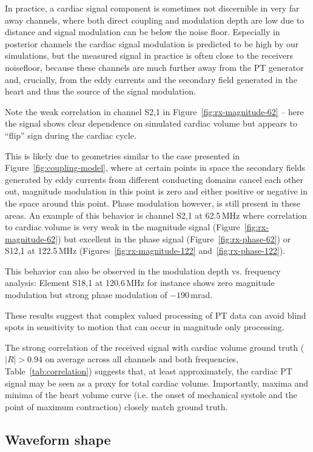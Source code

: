 \documentclass[
]{article}
\begin{document}
In practice, a cardiac signal component is sometimes not discernible in
very far away channels, where both direct coupling and modulation depth
are low due to distance and signal modulation can be below the noise
floor. Especially in posterior channels the cardiac signal modulation is predicted to be high by our simulations, but the measured signal in practice is often close to the receivers noisefloor, because these
channels are much further away from the PT generator and, crucially,
from the eddy currents and the secondary field generated in the heart
and thus the source of the signal modulation.

Note the weak correlation in channel S2,1 in Figure~\ref{fig:rx-magnitude-62} -- here the signal
shows clear dependence on simulated cardiac volume but appears to
``flip'' sign during the cardiac cycle.

This is likely due to geometries similar to the case presented in Figure~\ref{fig:coupling-model}, where at certain points in space the secondary fields generated by
eddy currents from different conducting domains cancel each other out,
magnitude modulation in this point is zero and either positive or
negative in the space around this point. Phase modulation however, is
still present in these areas. An example of this behavior is channel
S2,1 at 62.5\,MHz where correlation to cardiac volume is very weak in the
magnitude signal (Figure~\ref{fig:rx-magnitude-62}) but excellent in the phase signal (Figure~\ref{fig:rx-phase-62})
or S12,1 at 122.5\,MHz (Figures~\ref{fig:rx-magnitude-122} and~\ref{fig:rx-phase-122}).

This behavior can also be observed in the modulation depth vs. frequency
analysis: Element S18,1 at 120.6\,MHz for instance shows zero magnitude
modulation but strong phase modulation of $-190$\,mrad.

These results suggest that complex valued processing of PT data can
avoid blind spots in sensitivity to motion that can occur in
magnitude only processing.

The strong correlation of the received signal with cardiac volume ground
truth ($|R| > 0.94$ on average across all channels and both frequencies, Table~\ref{tab:correlation}) suggests that, at least approximately, the cardiac PT signal may
be seen as a proxy for total cardiac volume. Importantly, maxima and
minima of the heart volume curve (i.e. the onset of mechanical systole
and the point of maximum contraction) closely match ground truth.

\subsection{Waveform shape}\label{waveform-shape}
\end{document}
